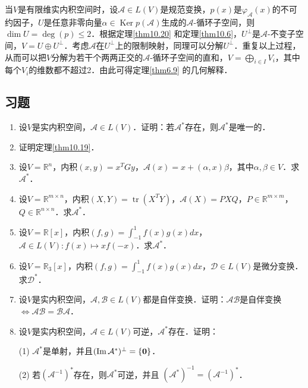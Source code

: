 \documentclass[a4paper,fontset=windows]{ctexbook}
\theoremstyle{definition}
\DeclareMathOperator{\im}{Im}
\DeclareMathOperator{\Ker}{Ker}
\DeclareMathOperator{\tr}{tr}
\renewcommand{\le}{\leqslant}
\begin{document}
\medskip 当$V$是有限维实内积空间时，设$\mathcal{A}\in L(V)$是规范变换，$p(x)$是$\varphi_{\mathcal{A}}(x)$的不可约因子，$U$是任意非零向量$\alpha\in\Ker p(\mathcal{A})$生成的$\mathcal{A}$-循环子空间，则$\dim U=\deg(p)\le 2$．根据定理\ref{thm10.20} 和定理\ref{thm10.6}，$U^\perp$是$\mathcal{A}$-不变子空间，$V=U\oplus U^\perp$．考虑$\mathcal{A}$在$U^\perp$上的限制映射，同理可以分解$U^\perp$．重复以上过程，从而可以把$V$分解为若干个两两正交的$\mathcal{A}$-循环子空间的直和，$V=\bigoplus\limits_{i\in I}V_i$，其中每个$V_i$的维数都不超过2．由此可得定理\ref{thm6.9} 的几何解释．

\subsection*{习题}

\begin{enumerate}
\item 设$V$是实内积空间，$\mathcal{A}\in L(V)$．证明：若$\mathcal{A}^*$存在，则$\mathcal{A}^*$是唯一的．

\item 证明定理\ref{thm10.19}．

\item 设$V=\mathbb{R}^n$，内积$(x,y)=x^TGy$，$\mathcal{A}(x)=x+(\alpha,x)\beta$，其中$\alpha,\beta\in V$．求$\mathcal{A}^*$．

\item 设$V=\mathbb{R}^{m\times n}$，内积$(X,Y)=\tr(X^TY)$，$\mathcal{A}(X)=PXQ$，$P\in\mathbb{R}^{m\times m}$，$Q\in\mathbb{R}^{n\times n}$．求$\mathcal{A}^*$．

\item 设$V=\mathbb{R}[x]$，内积$(f,g)=\int_{-1}^1f(x)g(x)dx$，$\mathcal{A}\in L(V):f(x)\mapsto xf(-x)$．求$\mathcal{A}^*$．

\item 设$V=\mathbb{R}_3[x]$，内积$(f,g)=\int_{-1}^1f(x)g(x)dx$，$\mathcal{D}\in L(V)$是微分变换．求$\mathcal{D}^*$．

\item 设$V$是实内积空间，$\mathcal{A,B}\in L(V)$都是自伴变换．证明：$\mathcal{AB}$是自伴变换$\Leftrightarrow\mathcal{AB}=\mathcal{BA}$．

\item 设$V$是实内积空间，$\mathcal{A}\in L(V)$可逆，$\mathcal{A}^*$存在．证明：

(1) $\mathcal{A}^*$是单射，并且$(\im\mathcal{A}^*)^\perp=\{{\bf 0}\}$．

(2) 若$(\mathcal{A}^{-1})^*$存在，则$\mathcal{A}^*$可逆，并且
$(\mathcal{A}^*)^{-1}=(\mathcal{A}^{-1})^*$．


\end{enumerate}
\end{document}
